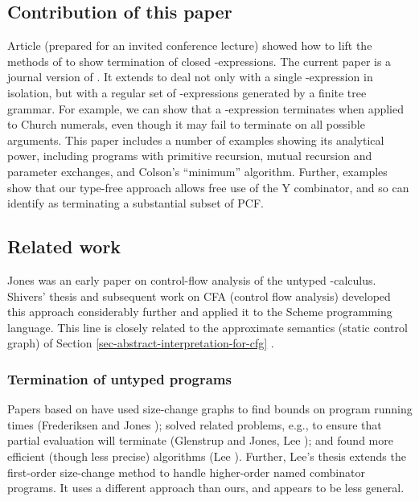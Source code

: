 \documentclass{LMCS}
\theoremstyle{definition}\newtheorem{env}[thm]{Environment}
\begin{document}
\subsection*{Contribution of this paper}

Article \cite{rta} (prepared for an invited conference lecture) showed
how to lift the methods of \cite{popl01} to show termination of closed
-expressions.  The current paper is a journal version of
\cite{rta}. It extends \cite{rta} to deal not only with a single
-expression in isolation, but with a regular set of
-expressions generated by a finite tree grammar.  For
example, we can show that a -expression terminates when
applied to Church numerals, even though it may fail to terminate on
all possible arguments.  This paper includes a number of examples
showing its analytical power, including programs with primitive
recursion, mutual recursion and parameter exchanges, and Colson's
``minimum'' algorithm.  Further, examples show that our type-free
approach allows free use of the Y combinator, and so can identify as
terminating a substantial subset of PCF.

\subsection{Related work}

Jones \cite{Jones:FALambda} was an early paper on control-flow analysis of the untyped -calculus.
Shivers' thesis and subsequent work  \cite{shivers1991,shivers2004} on CFA (control flow analysis) 
developed this approach considerably further and applied it to the Scheme
programming language. This line is
closely related to the approximate semantics (static control graph) 
of Section \ref{sec-abstract-interpretation-for-cfg}
 \cite{Jones:FALambda}.


\subsubsection*{Termination of untyped programs} 

Papers based on \cite{popl01} have used size-change graphs to 
find bounds on program running times 
(Frederiksen and Jones \cite{frederiksen-jones}); solved related problems, e.g., to ensure that 
partial evaluation will
terminate  (Glenstrup and Jones, Lee \cite{glenstrup-jones,lee-ptime-bta}); and
found more efficient (though less precise)
algorithms (Lee \cite{lee-poly-time-analysis}).
Further, Lee's thesis  \cite{lee-thesis} extends the first-order size-change method  
\cite{popl01} to handle higher-order named combinator programs.
It uses a different approach than ours, and appears to be less general.
\end{document}
